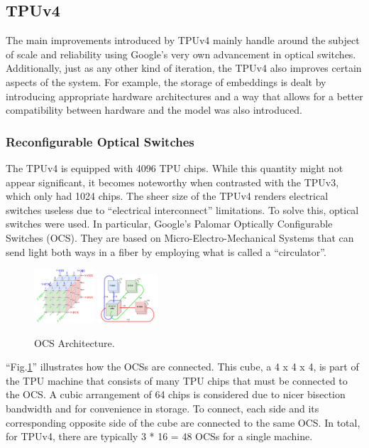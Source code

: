 \subsection{TPUv4}
\label{subsec:tpuv4}
The main improvements introduced by TPUv4 mainly handle around the subject of scale and reliability using Google's very own advancement in optical switches.
Additionally, just as any other kind of iteration, the TPUv4 also improves certain aspects of the system.
For example, the storage of embeddings is dealt by introducing appropriate hardware architectures and a way that allows for a better compatibility between hardware and the model was also introduced.

\subsubsection{Reconfigurable Optical Switches}
The TPUv4 is equipped with 4096 TPU chips.
While this quantity might not appear significant, it becomes noteworthy when contrasted with the TPUv3, which only had 1024 chips.
The sheer size of the TPUv4 renders electrical switches useless due to ``electrical interconnect'' limitations.
To solve this, optical switches were used.
In particular, Google's Palomar Optically Configurable Switches (OCS).
They are based on Micro-Electro-Mechanical Systems that can send light both ways in a fiber by employing what is called a ``circulator''.

\begin{figure}[htbp!]
    \centerline{\includegraphics[width=0.2\textwidth]{images/tpu_cube}
    \includegraphics[width=0.2\textwidth]{images/tpu_connectivity}}
    \caption{OCS Architecture.}
    \label{fig:ocsarch}
\end{figure}

``Fig.\ref{fig:ocsarch}'' illustrates how the OCSs are connected.
This cube, a 4 x 4 x 4, is part of the TPU machine that consists of many TPU chips that must be connected to the OCS\@.
A cubic arrangement of 64 chips is considered due to nicer bisection bandwidth and for convenience in storage.
To connect, each side and its corresponding opposite side of the cube are connected to the same OCS\@.
In total, for TPUv4, there are typically 3 * 16 = 48 OCSs for a single machine.

